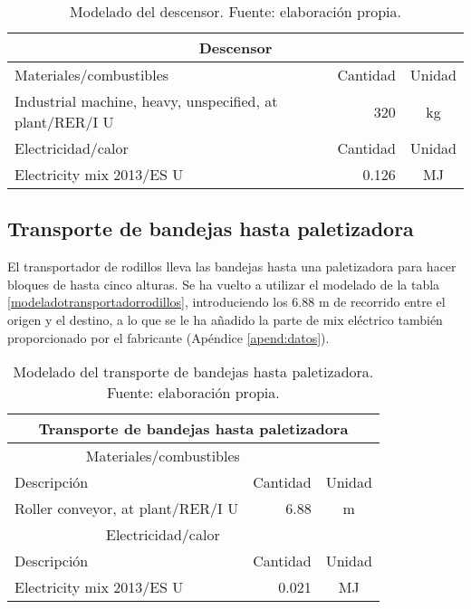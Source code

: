 \begin{table}[!htb]
\centering
\begin{tabular}{p{8cm}rc}
\toprule
\multicolumn{3}{c}{Descensor}\\
\midrule
Materiales/combustibles & Cantidad & Unidad\\
\midrule
Industrial machine, heavy, unspecified, at plant/RER/I U & 320 & \si{kg}\\
\midrule
Electricidad/calor & Cantidad & Unidad\\
\midrule
Electricity mix 2013/ES U & 0.126 & \si{MJ}\\
\bottomrule
\end{tabular}
\caption[Modelado del descensor.]{Modelado del descensor. Fuente: elaboración propia.}
\label{modeladodeldescensor}
\end{table}

\subsection{Transporte de bandejas hasta paletizadora}
El transportador de rodillos lleva las bandejas hasta una paletizadora para hacer bloques de hasta cinco alturas. Se ha vuelto a utilizar el modelado de la tabla \ref{modeladotransportadorrodillos}, introduciendo los 6.88 \si{m} de recorrido entre el origen y el destino, a lo que se le ha añadido la parte de mix eléctrico también proporcionado por el fabricante (Apéndice \ref{apend:datos}).

\begin{table}[!htb]
\centering
\begin{tabular}{p{8cm}rc}
\toprule
\multicolumn{3}{c}{Transporte de bandejas hasta paletizadora}\\
\midrule
\multicolumn{2}{c}{Materiales/combustibles}\\
\cmidrule(r){1-2}
Descripción & Cantidad & Unidad\\
\midrule
Roller conveyor, at plant/RER/I U & 6.88 & \si{m}\\
\midrule
\multicolumn{2}{c}{Electricidad/calor}\\
\cmidrule(r){1-2}
Descripción & Cantidad & Unidad\\
\midrule
Electricity mix 2013/ES U & 0.021 & \si{MJ}\\
\bottomrule
\end{tabular}
\caption[Modelado del transporte de bandejas hasta paletizadora.]{Modelado del transporte de bandejas hasta paletizadora. Fuente: elaboración propia.}
\label{modeladobandejaspalet}
\end{table}

